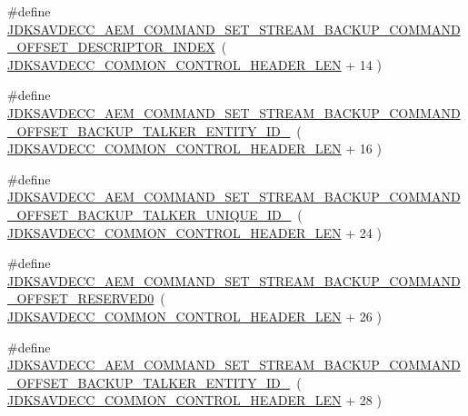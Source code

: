 \begin{DoxyCompactItemize}
\item 
\#define \hyperlink{group__command__set__stream__backup_ga2cd4b634f259772cbde5180d3db05e66}{J\+D\+K\+S\+A\+V\+D\+E\+C\+C\+\_\+\+A\+E\+M\+\_\+\+C\+O\+M\+M\+A\+N\+D\+\_\+\+S\+E\+T\+\_\+\+S\+T\+R\+E\+A\+M\+\_\+\+B\+A\+C\+K\+U\+P\+\_\+\+C\+O\+M\+M\+A\+N\+D\+\_\+\+O\+F\+F\+S\+E\+T\+\_\+\+D\+E\+S\+C\+R\+I\+P\+T\+O\+R\+\_\+\+I\+N\+D\+EX}~( \hyperlink{group__jdksavdecc__avtp__common__control__header_gaae84052886fb1bb42f3bc5f85b741dff}{J\+D\+K\+S\+A\+V\+D\+E\+C\+C\+\_\+\+C\+O\+M\+M\+O\+N\+\_\+\+C\+O\+N\+T\+R\+O\+L\+\_\+\+H\+E\+A\+D\+E\+R\+\_\+\+L\+EN} + 14 )
\item 
\#define \hyperlink{group__command__set__stream__backup_gac0dc59b5a96ae584bc6c15e523a764dc}{J\+D\+K\+S\+A\+V\+D\+E\+C\+C\+\_\+\+A\+E\+M\+\_\+\+C\+O\+M\+M\+A\+N\+D\+\_\+\+S\+E\+T\+\_\+\+S\+T\+R\+E\+A\+M\+\_\+\+B\+A\+C\+K\+U\+P\+\_\+\+C\+O\+M\+M\+A\+N\+D\+\_\+\+O\+F\+F\+S\+E\+T\+\_\+\+B\+A\+C\+K\+U\+P\+\_\+\+T\+A\+L\+K\+E\+R\+\_\+\+E\+N\+T\+I\+T\+Y\+\_\+\+I\+D\+\_}~( \hyperlink{group__jdksavdecc__avtp__common__control__header_gaae84052886fb1bb42f3bc5f85b741dff}{J\+D\+K\+S\+A\+V\+D\+E\+C\+C\+\_\+\+C\+O\+M\+M\+O\+N\+\_\+\+C\+O\+N\+T\+R\+O\+L\+\_\+\+H\+E\+A\+D\+E\+R\+\_\+\+L\+EN} + 16 )
\item 
\#define \hyperlink{group__command__set__stream__backup_ga52c91eebcf665a0c23e9c318bcf6cfd2}{J\+D\+K\+S\+A\+V\+D\+E\+C\+C\+\_\+\+A\+E\+M\+\_\+\+C\+O\+M\+M\+A\+N\+D\+\_\+\+S\+E\+T\+\_\+\+S\+T\+R\+E\+A\+M\+\_\+\+B\+A\+C\+K\+U\+P\+\_\+\+C\+O\+M\+M\+A\+N\+D\+\_\+\+O\+F\+F\+S\+E\+T\+\_\+\+B\+A\+C\+K\+U\+P\+\_\+\+T\+A\+L\+K\+E\+R\+\_\+\+U\+N\+I\+Q\+U\+E\+\_\+\+I\+D\+\_}~( \hyperlink{group__jdksavdecc__avtp__common__control__header_gaae84052886fb1bb42f3bc5f85b741dff}{J\+D\+K\+S\+A\+V\+D\+E\+C\+C\+\_\+\+C\+O\+M\+M\+O\+N\+\_\+\+C\+O\+N\+T\+R\+O\+L\+\_\+\+H\+E\+A\+D\+E\+R\+\_\+\+L\+EN} + 24 )
\item 
\#define \hyperlink{group__command__set__stream__backup_gacae8367160445e7f6f7fa916ddb5f37e}{J\+D\+K\+S\+A\+V\+D\+E\+C\+C\+\_\+\+A\+E\+M\+\_\+\+C\+O\+M\+M\+A\+N\+D\+\_\+\+S\+E\+T\+\_\+\+S\+T\+R\+E\+A\+M\+\_\+\+B\+A\+C\+K\+U\+P\+\_\+\+C\+O\+M\+M\+A\+N\+D\+\_\+\+O\+F\+F\+S\+E\+T\+\_\+\+R\+E\+S\+E\+R\+V\+E\+D0}~( \hyperlink{group__jdksavdecc__avtp__common__control__header_gaae84052886fb1bb42f3bc5f85b741dff}{J\+D\+K\+S\+A\+V\+D\+E\+C\+C\+\_\+\+C\+O\+M\+M\+O\+N\+\_\+\+C\+O\+N\+T\+R\+O\+L\+\_\+\+H\+E\+A\+D\+E\+R\+\_\+\+L\+EN} + 26 )
\item 
\#define \hyperlink{group__command__set__stream__backup_ga04f02ede378cc0e3abfb8b597ae48ef3}{J\+D\+K\+S\+A\+V\+D\+E\+C\+C\+\_\+\+A\+E\+M\+\_\+\+C\+O\+M\+M\+A\+N\+D\+\_\+\+S\+E\+T\+\_\+\+S\+T\+R\+E\+A\+M\+\_\+\+B\+A\+C\+K\+U\+P\+\_\+\+C\+O\+M\+M\+A\+N\+D\+\_\+\+O\+F\+F\+S\+E\+T\+\_\+\+B\+A\+C\+K\+U\+P\+\_\+\+T\+A\+L\+K\+E\+R\+\_\+\+E\+N\+T\+I\+T\+Y\+\_\+\+I\+D\+\_}~( \hyperlink{group__jdksavdecc__avtp__common__control__header_gaae84052886fb1bb42f3bc5f85b741dff}{J\+D\+K\+S\+A\+V\+D\+E\+C\+C\+\_\+\+C\+O\+M\+M\+O\+N\+\_\+\+C\+O\+N\+T\+R\+O\+L\+\_\+\+H\+E\+A\+D\+E\+R\+\_\+\+L\+EN} + 28 )

\end{DoxyCompactItemize}
